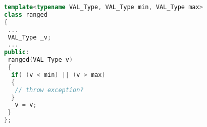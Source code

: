 \begin{lstlisting}[caption={Templated Range Constructor}, 
  language = C++, numbers = none, escapechar = !,label={lst:range},
    basicstyle = \ttfamily\bfseries\footnotesize, linewidth = \linewidth]
template<typename VAL_Type, VAL_Type min, VAL_Type max>
class ranged
{
 ...
 VAL_Type _v;
 ...
public:
 ranged(VAL_Type v)
 {
  if( (v < min) || (v > max)
  {
   // throw exception?
  }
  _v = v;
 }
};
\end{lstlisting}

\vspace{-2em}
